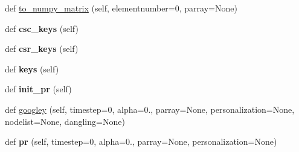 \begin{DoxyCompactItemize}
\item 
def \mbox{\hyperlink{classdsmacc_1_1graph_1_1STPR_1_1Sparse3D_aa74d5a620b2d4e87d20c8355f46bde67}{to\+\_\+numpy\+\_\+matrix}} (self, elementnumber=0, parray=None)
\item 
\mbox{\label{classdsmacc_1_1graph_1_1STPR_1_1Sparse3D_a9025f20ab586b70e96f1f993d8b6c516}} 
def {\bfseries csc\+\_\+keys} (self)
\item 
\mbox{\label{classdsmacc_1_1graph_1_1STPR_1_1Sparse3D_ab9550908600c645a9bb5917ebf977bd1}} 
def {\bfseries csr\+\_\+keys} (self)
\item 
\mbox{\label{classdsmacc_1_1graph_1_1STPR_1_1Sparse3D_aff7959656875ba0d21c3558429f89278}} 
def {\bfseries keys} (self)
\item 
\mbox{\label{classdsmacc_1_1graph_1_1STPR_1_1Sparse3D_a15e1e621cb7ba85161e2bdcc694fefc8}} 
def {\bfseries init\+\_\+pr} (self)
\item 
def \mbox{\hyperlink{classdsmacc_1_1graph_1_1STPR_1_1Sparse3D_a14328eb65ee83cc72f0b22b85100818d}{googley}} (self, timestep=0, alpha=0., parray=None, personalization=None, nodelist=None, dangling=None)
\item 
\mbox{\label{classdsmacc_1_1graph_1_1STPR_1_1Sparse3D_a14424ed2b5bda571feeeaa0fb0364cb6}} 
def {\bfseries pr} (self, timestep=0, alpha=0., parray=None, personalization=None)
\end{DoxyCompactItemize}
